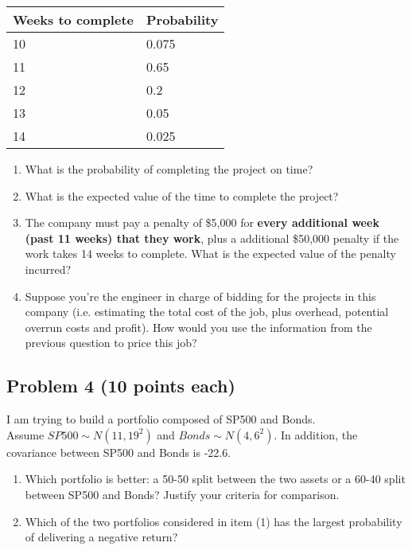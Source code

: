 \documentclass[12pt]{article}
\begin{document}
\begin{table}[h]
\centering
\label{my-label}
\begin{tabular}{|l|l|}
\hline
Weeks to complete & Probability \\ \hline
10    & 0.075        \\ \hline
11    & 0.65         \\ \hline
12    & 0.2        \\ \hline
13    & 0.05         \\ \hline
14    & 0.025         \\ \hline
\end{tabular}
\end{table}

\begin{enumerate}
\item What is the probability of completing the project on time?
\vspace{1.5cm}

\item What is the expected value of the time to complete the project?
\vspace{2cm}


\item The company must pay a penalty of \$5,000 for {\bf every additional week (past 11 weeks) that they work}, plus a additional \$50,000 penalty if the work takes 14 weeks to complete. What is the expected value of the penalty incurred?
\vspace{3cm}


\item Suppose you're the engineer in charge of bidding for the projects in this company (i.e. estimating the total cost of the job, plus overhead, potential overrun costs and profit). How would you use the information from the previous question to price this job?
\end{enumerate}

\newpage





\subsection*{Problem 4 (10 points each)}
I am trying to build a portfolio composed of SP500 and Bonds. \\ Assume $SP500 \sim N(11,19^2)$ and $Bonds \sim N(4,6^2)$. In addition,  the covariance between SP500 and Bonds is -22.6. 

\vspace{0.5cm}
\begin{enumerate}
\item Which portfolio is better: a 50-50 split between the two assets or a 60-40 split between SP500 and Bonds? Justify your criteria for comparison.
\vspace{9cm}

\item Which of the two portfolios considered in item (1) has the largest probability of delivering a negative return?

\end{enumerate}
\end{document}
